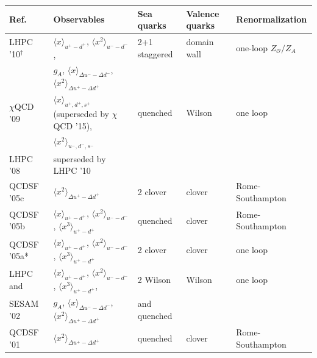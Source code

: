 \begin{table}[!t]
\renewcommand{\arraystretch}{1.2} 
\centering
\footnotesize
\begin{threeparttable}
\begin{tabular}{lllll}
\toprule
Ref. & Observables & Sea quarks & Valence quarks & Renormalization \\
\midrule

  LHPC '10$^{\dagger}$
  \cite{Bratt:2010jn} &
  $\langle x\rangle_{u^+-d^+}$,
  $\langle x^2\rangle_{u^--d^-}$, &
  2+1 staggered &
  domain wall &
  one-loop $Z_\mathcal{O}/Z_A$ \\
  &   $g_A$,
  $\langle x\rangle_{\Delta u^--\Delta d^-}$,
  $\langle x^2\rangle_{\Delta u^+-\Delta d^+}$ & & & \\

  $\chi$QCD '09 \cite{Deka:2008xr} &
  $\langle x\rangle_{u^+,d^+,s^+}$ (superseded by $\chi$QCD '15), &
  quenched &
  Wilson &
  one loop \\
  & $\langle x^2 \rangle_{u^-,d^-,s^-}$ & & &\\

  LHPC '08 \cite{Hagler:2007xi} &
  superseded by LHPC '10 & & &\\

  QCDSF '05c \cite{Gockeler:2005vw} &
  $\langle x^2\rangle_{\Delta u^+-\Delta d^+}$ &
  2 clover & clover & Rome-Southampton \\

  QCDSF '05b \cite{Gockeler:2004wp} &
  $\langle x\rangle_{u^+-d^+}$,
  $\langle x^2\rangle_{u^--d^-}$,
  $\langle x^3\rangle_{u^+-d^+}$ &
  quenched &
  clover &
  Rome-Southampton \\

  QCDSF '05a* \cite{Gockeler:2004vx} &
  $\langle x\rangle_{u^+-d^+}$,
  $\langle x^2\rangle_{u^--d^-}$,
  $\langle x^3\rangle_{u^+-d^+}$ &
  2 clover & clover & one loop \\

  LHPC and &
  $\langle x\rangle_{u^+-d^+}$,
  $\langle x^2\rangle_{u^--d^-}$,
  $\langle x^3\rangle_{u^+-d^+}$, &
  2 Wilson & Wilson & one loop \\
  SESAM '02 \cite{Dolgov:2002zm} &
  $g_A$,
  $\langle x\rangle_{\Delta u^--\Delta d^-}$,
  $\langle x^2\rangle_{\Delta u^+-\Delta d^+}$ &
  and quenched & & \\

  QCDSF '01 \cite{Gockeler:2000ja} &
  $\langle x^2\rangle_{\Delta u^+-\Delta d^+}$ &
  quenched & clover & Rome-Southampton \\


\end{tabular}
\end{threeparttable}
\end{table}

